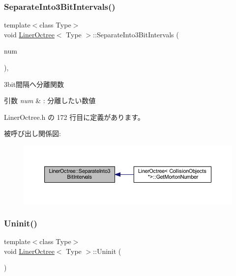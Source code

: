 \subsubsection{\texorpdfstring{Separate\+Into3\+Bit\+Intervals()}{SeparateInto3BitIntervals()}}
{\footnotesize\ttfamily template$<$class Type$>$ \\
void \mbox{\hyperlink{class_liner_octree}{Liner\+Octree}}$<$ Type $>$\+::Separate\+Into3\+Bit\+Intervals (\begin{DoxyParamCaption}\item[{D\+W\+O\+RD $\ast$}]{num }\end{DoxyParamCaption})\hspace{0.3cm}{\ttfamily [inline]}, {\ttfamily [private]}}



3bit間隔へ分離関数 


\begin{DoxyParams}{引数}
{\em num} & \+: 分離したい数値 \\
\hline
\end{DoxyParams}


 Liner\+Octree.\+h の 172 行目に定義があります。

被呼び出し関係図\+:
\nopagebreak
\begin{figure}[H]
\begin{center}
\leavevmode
\includegraphics[width=350pt]{class_liner_octree_acfa567ec0f969684f55443fc9ee98432_icgraph}
\end{center}
\end{figure}
\mbox{\label{class_liner_octree_a86b5b9bc86630644e84508ff385cda69}} 
\subsubsection{\texorpdfstring{Uninit()}{Uninit()}}
{\footnotesize\ttfamily template$<$class Type$>$ \\
void \mbox{\hyperlink{class_liner_octree}{Liner\+Octree}}$<$ Type $>$\+::Uninit (\begin{DoxyParamCaption}{ }\end{DoxyParamCaption})\hspace{0.3cm}{\ttfamily [inline]}}



